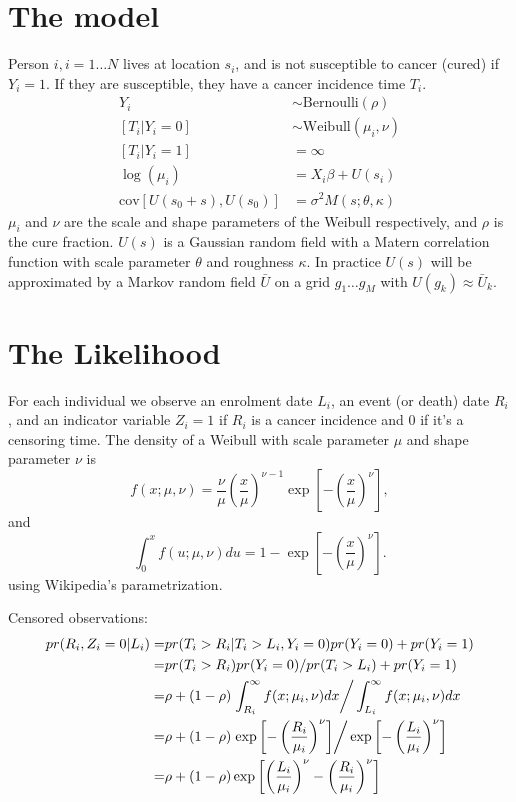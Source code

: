 \documentclass{article}
\begin{document}
\section{The model}
Person $i, i=1\ldots N$ lives at location $s_i$, and is not susceptible to cancer (cured) if $Y_i=1$.  If they are susceptible, they have a cancer incidence time $T_i$.
\begin{align*}
Y_i & \sim \text{Bernoulli}(\rho)\\
[T_i | Y_i = 0] &\sim \text{Weibull}(\mu_i, \nu)\\
[T_i | Y_i = 1] & = \infty \\
\log(\mu_i) &= X_i \beta + U(s_i)\\
\text{cov}[U(s_0 + s), U(s_0)] &= \sigma^2 M(s; \theta, \kappa) 
\end{align*}
$\mu_i$ and $\nu$ are the scale and shape parameters of the Weibull respectively, and $\rho$ is the cure fraction.  $U(s)$ is a Gaussian random field with a Matern correlation function with scale parameter $\theta$ and roughness $\kappa$.  In practice $U(s)$ will be approximated by a Markov random field $\bar U$ on a grid $g_1 \ldots g_M$ with $U(g_k) \approx \bar U_k$.

\section{The Likelihood}
For each individual we observe an enrolment date $L_i$, an event (or death) date $R_i$, and an indicator variable $Z_i = 1$ if $R_i$ is a cancer incidence and 0 if it's a censoring time. The density of a Weibull with scale parameter $\mu$ and shape parameter $\nu$ is 
\[
f(x;\mu,\nu) = \frac{\nu}{\mu} \left(\frac{x}{\mu}\right)^{\nu-1} \exp\left[-\left(\frac{x}{\mu}\right)^\nu\right],
\]
and
\[
\int_0^x f(u;\mu,\nu)du = 1-\exp\left[-\left(\frac{x}{\mu}\right)^\nu\right].
\]
using Wikipedia's parametrization.

Censored observations:
\begin{align*}
pr(R_i, Z_i=0 | L_i) =& pr(T_i > R_i | T_i > L_i, Y_i =0) pr(Y_i =0)  + pr(Y_i =1)\\
=&pr(T_i > R_i) pr(Y_i = 0)/pr(T_i > L_i) + pr(Y_i =1)\\
=& \rho + (1-\rho) \left. \int_{R_i}^\infty f(x;\mu_i, \nu) dx \right/\int_{L_i}^\infty f(x;\mu_i, \nu) dx  \\
= &  \rho + (1-\rho) \left. \exp\left[-\left(\frac{R_i}{\mu_i}\right)^\nu\right] \right/\exp\left[-\left(\frac{L_i}{\mu_i}\right)^\nu\right]\\
= &  \rho + (1-\rho) \exp\left[\left(\frac{L_i}{\mu_i}\right)^\nu -\left(\frac{R_i}{\mu_i}\right)^\nu\right] \\
\end{align*}
\end{document}
